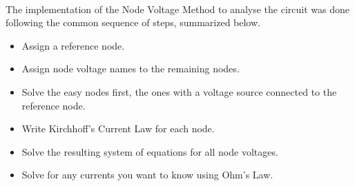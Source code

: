 \paragraph{}
The implementation of the Node Voltage Method to analyse the circuit was done following the common sequence of steps, summarized below.
\begin{itemize}
    \item Assign a reference node.
    \item Assign node voltage names to the remaining nodes.
    \item Solve the easy nodes first, the ones with a voltage source connected to the reference node.
    \item Write Kirchhoff's Current Law for each node.
    \item Solve the resulting system of equations for all node voltages.
    \item Solve for any currents you want to know using Ohm's Law.
\end{itemize}

